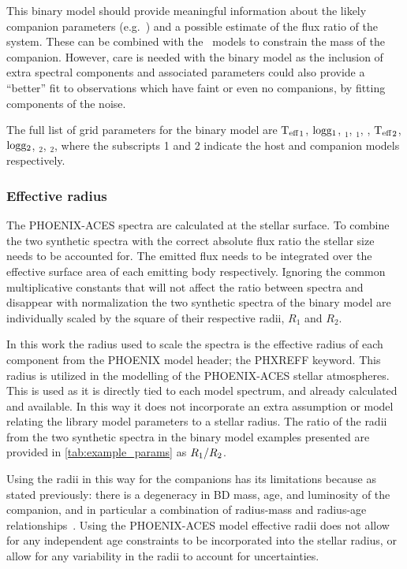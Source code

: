 This binary model should provide meaningful information about the likely companion parameters (e.g.\ \Teff{}) and a possible estimate of the flux ratio of the system.
These can be combined with the~\citet{baraffe_evolutionary_2003} models to constrain the mass of the companion.
However, care is needed with the binary model as the inclusion of extra spectral components and associated parameters could also provide a ``better'' fit to observations which have faint or even no companions, by fitting components of the noise.

The full list of grid parameters for the binary model are \({\textrm{T}_{\mathrm{eff}}}_{1}\), \(\textrm{logg}{}_{1}\), \feh{}\(_{1}\), \alphafe{}\(_{1}\), \Rvone{}, \({\textrm{T}_{\mathrm{eff}}}_{2}\), \(\textrm{logg}{}_{2}\), \feh{}\(_{2}\), \alphafe{}\(_{2}\), \Rvtwo{} where the subscripts 1 and 2 indicate the host and companion models respectively.


\subsubsection{Effective radius}
\label{subsection-radius}

The PHOENIX-ACES spectra are calculated at the stellar surface.
To combine the two synthetic spectra with the correct absolute flux ratio the stellar size needs to be accounted for.
The emitted flux needs to be integrated over the effective surface area of each emitting body respectively.
Ignoring the common multiplicative constants that will not affect the ratio between spectra and disappear with normalization the two synthetic spectra of the binary model are individually scaled by the square of their respective radii, \(R_{1}\) and \(R_{2}\).

In this work the radius used to scale the spectra is the effective radius of each component from the {PHOENIX} model header; the {PHXREFF} keyword.
This radius is utilized in the modelling of the {PHOENIX-ACES} stellar atmospheres.
This is used as it is directly tied to each model spectrum, and already calculated and available.
In this way it does not incorporate an extra assumption or model relating the library model parameters to a stellar radius.
The ratio of the radii from the two synthetic spectra in the binary model examples presented are provided in \cref{tab:example_params} as \({R}_{1}/{R}_{2}\).

Using the radii in this way for the companions has its limitations because as stated previously: there is a degeneracy in {BD} mass, age, and luminosity of the companion, and in particular a combination of radius-mass and radius-age relationships~\citep{sorahana_radii_2013}.
Using the {PHOENIX-ACES} model effective radii does not allow for any independent age constraints to be incorporated into the stellar radius, or allow for any variability in the radii to account for uncertainties.

